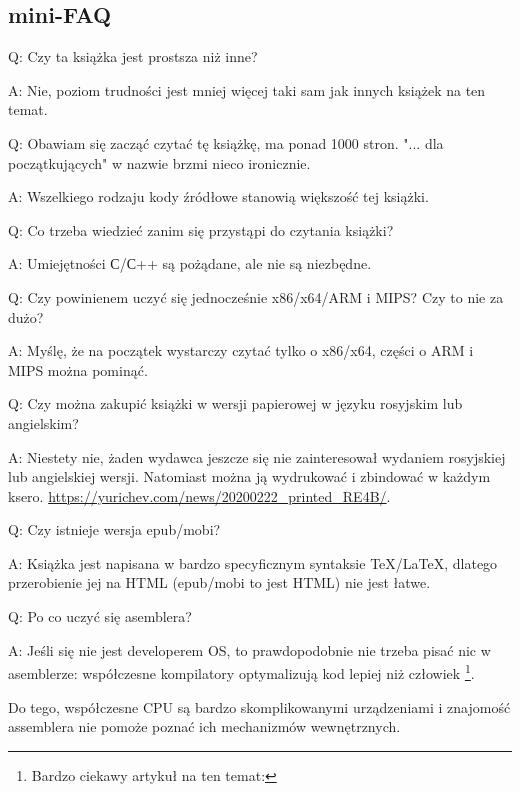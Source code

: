 \subsection*{mini-FAQ}

\par Q: Czy ta książka jest prostsza niż inne?
\par A: Nie, poziom trudności jest mniej więcej taki sam jak innych książek na ten temat.

\par Q: Obawiam się zacząć czytać tę książkę, ma ponad 1000 stron. 
"... dla początkujących" w nazwie brzmi nieco ironicznie.
\par A: Wszelkiego rodzaju kody źródłowe stanowią większość tej książki.

\par Q: Co trzeba wiedzieć zanim się przystąpi do czytania książki?
\par A: Umiejętności С/С++ są pożądane, ale nie są niezbędne.

\par Q: Czy powinienem uczyć się jednocześnie x86/x64/ARM i MIPS? Czy to nie za dużo?
\par A: Myślę, że na początek wystarczy czytać tylko o x86/x64, części o ARM i MIPS można pominąć.

\par Q: Czy można zakupić książki w wersji papierowej w języku rosyjskim lub angielskim?
\par A: Niestety nie, żaden wydawca jeszcze się nie zainteresował wydaniem rosyjskiej lub angielskiej wersji. Natomiast można ją wydrukować i zbindować w każdym ksero.
\url{https://yurichev.com/news/20200222_printed_RE4B/}.

\par Q: Czy istnieje wersja epub/mobi?
\par A: Książka jest napisana w bardzo specyficznym syntaksie TeX/LaTeX, dlatego przerobienie jej na HTML (epub/mobi to jest HTML)
nie jest łatwe.

\par Q: Po co uczyć się asemblera?
\par A: Jeśli się nie jest developerem \ac{OS}, to prawdopodobnie nie trzeba pisać nic w asemblerze: współczesne kompilatory optymalizują kod lepiej niż człowiek \footnote{Bardzo ciekawy artykuł na ten temat: \InSqBrackets{\AgnerFog}}.

Do tego, współczesne \ac{CPU} są bardzo skomplikowanymi urządzeniami i znajomość assemblera nie pomoże poznać ich mechanizmów wewnętrznych.

